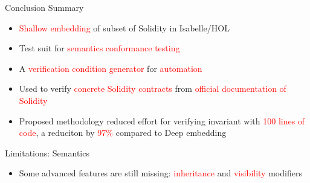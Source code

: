 \documentclass[aspectratio=169]{beamer}
\begin{document}
\begin{frame}{Conclusion}
Summary
\begin{itemize}
	\item \textcolor{red}{Shallow embedding} of subset of Solidity in Isabelle/HOL
	\item Test suit for  \textcolor{red}{semantics conformance testing}
	\item A \textcolor{red}{verification condition generator} for \textcolor{red}{automation}
	\item Used to verify \textcolor{red}{concrete Solidity contracts} from \textcolor{red}{official documentation of Solidity}
	\item Proposed methodology reduced effort for verifying invariant with \textcolor{red}{100 lines of code}, a reduciton by \textcolor{red}{ 97\%} compared to Deep embedding 
\end{itemize}
\bigskip

Limitations: Semantics
\begin{itemize}
	\item Some advanced features are still missing: \textcolor{red}{inheritance} and \textcolor{red}{visibility} modifiers
\end{itemize}
\end{frame}
%
%
%
%
\end{document}
